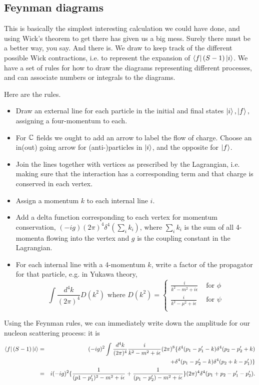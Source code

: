 \subsection*{Feynman diagrams} This is basically the simplest interesting calculation we could have done, and using Wick's theorem to get there has given us a big mess. Surely there must be a better way, you say. And there is. We draw  to keep track of the different possible Wick contractions, i.e. to represent the expansion of $\left< f \right|(S-1)\left| i \right>$. We have a set of rules for how to draw the diagrams representing different processes, and can associate numbers or integrals to the diagrams.

Here are the rules.
\begin{itemize}
    \item Draw an external line for each particle in the initial and final states $\left| i \right>,\left| f \right>,$ assigning a four-momentum to each. 
    \item For $\mathbb{C}$ fields we ought to add an arrow to label the flow of charge. Choose an in(out) going arrow for (anti-)particles in $\left| i \right>$, and the opposite for $\left| f \right>$.
    \item Join the lines together with vertices as prescribed by the Lagrangian, i.e. making sure that the interaction has a corresponding term and that charge is conserved in each vertex.
    \item Assign a momentum $k$ to each internal line $i$.
    \item Add a delta function corresponding to each vertex for momentum conservation, $(-ig)(2\pi)^4 \delta^4(\sum_i k_i)$, where $\sum_i k_i$ is the sum of all 4-momenta flowing into the vertex and $g$ is the coupling constant in the Lagrangian.
    \item For each internal line with a 4-momentum $k$, write a factor of the propagator for that particle, e.g. in Yukawa theory,
    $$\int \frac{d^4k}{(2\pi)^4} D(k^2)\text{ where }D(k^2)=\begin{cases}
    \frac{i}{k^2-m^2+i\epsilon} & \text{ for }\phi\\
    \frac{i}{k^2-\mu^2+i\epsilon} & \text{ for }\psi\\
    \end{cases}$$
\end{itemize}

Using the Feynman rules, we can immediately write down the amplitude for our nucleon scattering process: it is
\begin{eqnarray*}
\left< f \right|(S-1)\left| i \right>&=&(-ig)^2\int \frac{d^4k}{(2\pi)^4} \frac{i}{k^2-m^2+i\epsilon} (2\pi)^8 \{\delta^4(p_1-p_1' -k)\delta^4(p_2-p_2' +k)\\
&&+\delta^4(p_1-p_2'-k)\delta^4(p_2+k-p_1')\}\\
&=& i(-ig)^2 \{\frac{1}{(p1-p_1')^2-m^2+i\epsilon}+\frac{1}{(p_1-p_2')-m^2+i\epsilon}\} (2\pi)^4 \delta^4(p_1+p_2-p_1' -p_2').
\end{eqnarray*}

